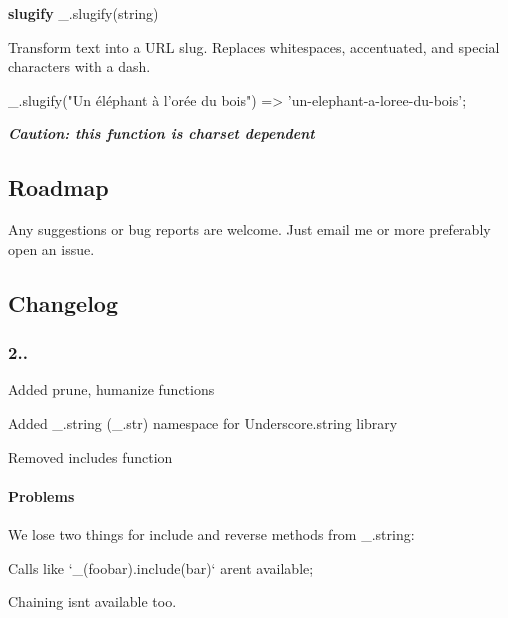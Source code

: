 {\bfseries slugify} \+\_\+.\+slugify(string)

Transform text into a U\+RL slug. Replaces whitespaces, accentuated, and special characters with a dash.


\begin{DoxyCode}
\_.slugify("Un éléphant à l'orée du bois")
=> 'un-elephant-a-loree-du-bois';
\end{DoxyCode}


{\itshape {\bfseries Caution\+: this function is charset dependent}}

\subsection*{Roadmap}

Any suggestions or bug reports are welcome. Just email me or more preferably open an issue.

\subsection*{Changelog}

\subsubsection*{2..}


\begin{DoxyItemize}
\item Added prune, humanize functions
\item Added \+\_\+.\+string (\+\_\+.\+str) namespace for Underscore.\+string library
\item Removed includes function
\end{DoxyItemize}

\paragraph*{Problems}

We lose two things for {\ttfamily include} and {\ttfamily reverse} methods from {\ttfamily \+\_\+.\+string}\+:


\begin{DoxyItemize}
\item Calls like `\+\_\+(\textquotesingle{}foobar\textquotesingle{}).include(\textquotesingle{}bar\textquotesingle{})` aren\textquotesingle{}t available;
\item Chaining isn\textquotesingle{}t available too.
\end{DoxyItemize}

